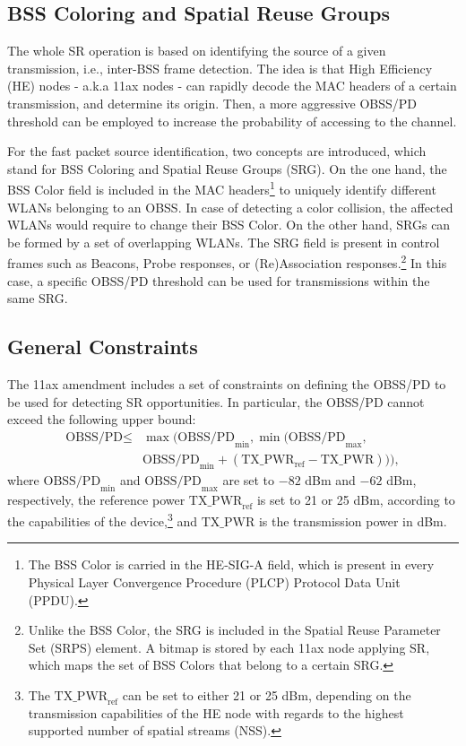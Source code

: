 \documentclass[conference]{IEEEtran}
\begin{document}
	\subsection{BSS Coloring and Spatial Reuse Groups}
	
	The whole SR operation is based on identifying the source of a given transmission, i.e., inter-BSS frame detection. The idea is that High Efficiency (HE) nodes - a.k.a 11ax nodes - can rapidly decode the MAC headers of a certain transmission, and determine its origin. Then, a more aggressive OBSS/PD threshold can be employed to increase the probability of accessing to the channel.
	
	For the fast packet source identification, two concepts are introduced, which stand for BSS Coloring and Spatial Reuse Groups (SRG). On the one hand, the BSS Color field is included in the MAC headers\footnote{The BSS Color is carried in the HE-SIG-A field, which is present in every Physical Layer Convergence Procedure (PLCP) Protocol Data Unit (PPDU).} to uniquely identify different WLANs belonging to an OBSS. In case of detecting a color collision, the affected WLANs would require to change their BSS Color. On the other hand, SRGs can be formed by a set of overlapping WLANs. The SRG field is present in control frames such as Beacons, Probe responses, or (Re)Association responses.\footnote{Unlike the BSS Color, the SRG is included in the Spatial Reuse Parameter Set (SRPS) element. A bitmap is stored by each 11ax node applying SR, which maps the set of BSS Colors that belong to a certain SRG.} In this case, a specific OBSS/PD threshold can be used for transmissions within the same SRG.
		
	\subsection{General Constraints}
	The 11ax amendment includes a set of constraints on defining the OBSS/PD to be used for detecting SR opportunities. In particular, the OBSS/PD cannot exceed the following upper bound:
	\begin{align}\nonumber \text{OBSS/PD} \leq & \max\Big(\text{OBSS/PD}_{\min}, \min\big(\text{OBSS/PD}_{\max},\\ & \text{OBSS/PD}_{\min} + (\text{TX\_PWR}_{\text{ref}}-\text{TX\_PWR})\big)\Big), \nonumber \end{align}
	where $\text{OBSS/PD}_{\min}$ and $\text{OBSS/PD}_{\max}$ are set to $-82$ dBm and $-62$ dBm, respectively, the reference power $\text{TX\_PWR}_{\text{ref}}$ is set to 21 or 25 dBm, according to the
	capabilities of the device,\footnote{The $\text{TX\_PWR}_{\text{ref}}$ can be set to either 21 or 25 dBm, depending on the transmission capabilities of the HE node with regards to the highest supported number of spatial streams (NSS).} and $\text{TX\_PWR}$ is the transmission power in dBm.
	
\end{document}
